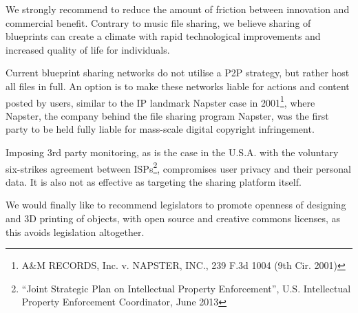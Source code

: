 We strongly recommend to reduce the amount of friction between innovation and commercial benefit.
Contrary to music file sharing, we believe sharing of blueprints can create a climate with rapid technological improvements and increased quality of life for individuals.

Current blueprint sharing networks do not utilise a P2P strategy, but rather host all files in full. 
An option is to make these networks liable for actions and content posted by users, similar to the IP landmark Napster case in 2001\footnote{A\&M RECORDS, Inc. v. NAPSTER, INC., 239 F.3d 1004 (9th Cir. 2001)}, where Napster, the company behind the file sharing program Napster, was the first party to be held fully liable for mass-scale digital copyright infringement.

Imposing 3rd party monitoring, as is the case in the U.S.A. with the voluntary six-strikes agreement between ISPs\footnote{``Joint Strategic Plan on Intellectual Property Enforcement'', U.S. Intellectual Property Enforcement Coordinator, June 2013}, compromises user privacy and their personal data.
It is also not as effective as targeting the sharing platform itself.

We would finally like to recommend legislators to promote openness of designing and 3D printing of objects, with open source and creative commons licenses, as this avoids legislation altogether.
